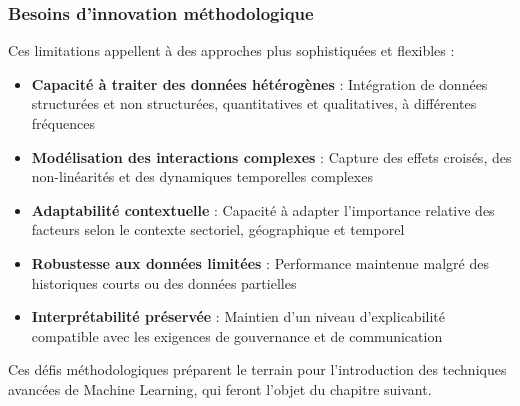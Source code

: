 \subsubsection{Besoins d'innovation méthodologique}

Ces limitations appellent à des approches plus sophistiquées et flexibles :

\begin{itemize}
    \item \textbf{Capacité à traiter des données hétérogènes} : Intégration de données structurées et non structurées, quantitatives et qualitatives, à différentes fréquences
    
    \item \textbf{Modélisation des interactions complexes} : Capture des effets croisés, des non-linéarités et des dynamiques temporelles complexes
    
    \item \textbf{Adaptabilité contextuelle} : Capacité à adapter l'importance relative des facteurs selon le contexte sectoriel, géographique et temporel
    
    \item \textbf{Robustesse aux données limitées} : Performance maintenue malgré des historiques courts ou des données partielles
    
    \item \textbf{Interprétabilité préservée} : Maintien d'un niveau d'explicabilité compatible avec les exigences de gouvernance et de communication
\end{itemize}

Ces défis méthodologiques préparent le terrain pour l'introduction des techniques avancées de Machine Learning, qui feront l'objet du chapitre suivant.